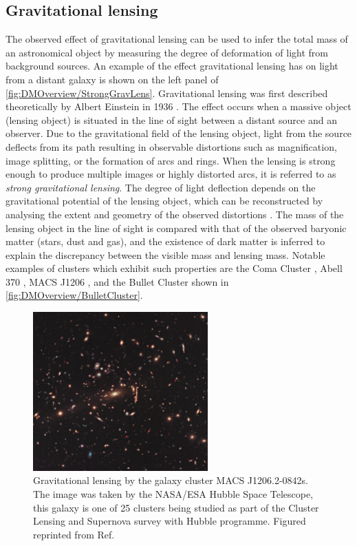 \subsection{Gravitational lensing}\label{sec:DMOverview/GravLens}
The observed effect of gravitational lensing can be used to infer the total mass of an astronomical object by measuring the degree of deformation of light from background sources. An example of the effect gravitational lensing has on light from a distant galaxy is shown on the left panel of \autoref{fig:DMOverview/StrongGravLens}. Gravitational lensing was first described theoretically by Albert Einstein in 1936 \cite{GravLens}. The effect occurs when a massive object (lensing object) is situated in the line of sight between a distant source and an observer. Due to the gravitational field of the lensing object, light from the source deflects from its path resulting in observable distortions such as magnification, image splitting, or the formation of arcs and rings.
When the lensing is strong enough to produce multiple images or highly distorted arcs, it is referred to as \textit{strong gravitational lensing}.
The degree of light deflection depends on the gravitational potential of the lensing object, which can be reconstructed by analysing the extent and geometry of the observed distortions \cite{Young2016}. 
The mass of the lensing object in the line of sight is compared with that of the observed baryonic matter (stars, dust and gas), and the existence of dark matter is inferred to explain the discrepancy between the visible mass and lensing mass. 
Notable examples of clusters which exhibit such properties are the Coma Cluster \cite{Briel:1997hz}, Abell 370 \cite{Natarajan:2024iqm}, MACS J1206 \cite{GravLensPicture}, and the Bullet Cluster \cite{Clowe2006} shown in \autoref{fig:DMOverview/BulletCluster}.
\iffalse
\begin{figure}[ht!]
	\centering
	\includegraphics[width=0.6\textwidth]{figures/DMOverview/GravLensIm.jpg}
	\caption[Gravitational lensing by the galaxy cluster MACS J1206.2-0842s.]{Gravitational lensing by the galaxy cluster MACS J1206.2-0842s. The image was taken by the NASA/ESA Hubble Space Telescope, this galaxy is one of 25 clusters being studied as part of the Cluster Lensing and Supernova survey with Hubble programme. Figured reprinted from Ref.~\cite{GravLensPicture}}
	\label{fig:DMOverview/GravLens}
\end{figure}
